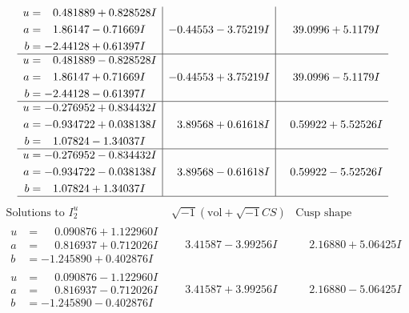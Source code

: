 \documentclass[1p]{elsarticle_modified}
\theoremstyle{definition}
\newcommand{\I}{\sqrt{-1}}
\begin{document}
$$\begin{array}{c|c|c}
\begin{aligned}
u &= \phantom{-}0.481889 + 0.828528 I \\
a &= \phantom{-}1.86147 - 0.71669 I \\
b &= -2.44128 + 0.61397 I\end{aligned}
 & -0.44553 - 3.75219 I & \phantom{-}39.0996 + 5.1179 I \\ \hline\begin{aligned}
u &= \phantom{-}0.481889 - 0.828528 I \\
a &= \phantom{-}1.86147 + 0.71669 I \\
b &= -2.44128 - 0.61397 I\end{aligned}
 & -0.44553 + 3.75219 I & \phantom{-}39.0996 - 5.1179 I \\ \hline\begin{aligned}
u &= -0.276952 + 0.834432 I \\
a &= -0.934722 + 0.038138 I \\
b &= \phantom{-}1.07824 - 1.34037 I\end{aligned}
 & \phantom{-}3.89568 + 0.61618 I & \phantom{-}0.59922 + 5.52526 I \\ \hline\begin{aligned}
u &= -0.276952 - 0.834432 I \\
a &= -0.934722 - 0.038138 I \\
b &= \phantom{-}1.07824 + 1.34037 I\end{aligned}
 & \phantom{-}3.89568 - 0.61618 I & \phantom{-}0.59922 - 5.52526 I\\
 \hline 
 \end{array}$$\newpage$$\begin{array}{c|c|c}  
\text{Solutions to }I^u_{2}& \I (\text{vol} + \sqrt{-1}CS) & \text{Cusp shape}\\
 \hline 
\begin{aligned}
u &= \phantom{-}0.090876 + 1.122960 I \\
a &= \phantom{-}0.816937 + 0.712026 I \\
b &= -1.245890 + 0.402876 I\end{aligned}
 & \phantom{-}3.41587 - 3.99256 I & \phantom{-}2.16880 + 5.06425 I \\ \hline\begin{aligned}
u &= \phantom{-}0.090876 - 1.122960 I \\
a &= \phantom{-}0.816937 - 0.712026 I \\
b &= -1.245890 - 0.402876 I\end{aligned}
 & \phantom{-}3.41587 + 3.99256 I & \phantom{-}2.16880 - 5.06425 I \\ \hline\begin{aligned}

\end{aligned}
\end{array}$$
\end{document}
